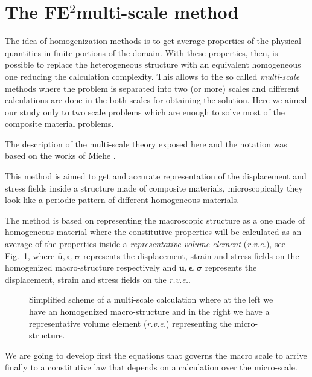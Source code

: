 \documentclass[preprint]{elsarticle}
\newcommand{\fe}{FE$^2$}
\begin{document}
\section{The \fe multi-scale method}

The idea of homogenization methods is to get average properties of the physical
quantities in finite portions of the domain. With these properties, then, is 
possible to replace the heterogeneous structure with an equivalent homogeneous
one reducing the calculation complexity. This allows to the so called
\emph{multi-scale} methods where the problem is separated into two (or more)
scales and different calculations are done in the both scales
for obtaining the solution. Here we aimed our study only to two scale problems
which are enough to solve most of the composite material problems.

The description of the multi-scale theory exposed here and the 
notation was based on the works of Miehe \cite{miehe2002}.

This method is aimed to get and accurate representation of the displacement 
and stress fields inside a structure made of composite materials, microscopically
they look like a periodic pattern of different homogeneous materials.

The method is based on representing the macroscopic structure as a one made of 
homogeneous material where the constitutive properties will be calculated as an 
average of the properties inside a \emph{representative volume element} (\emph{r.v.e.}),
see Fig.~\ref{fig:multi-scale}, where 
$\overline{\bm{u}}, \overline{\bm{\epsilon}}, \overline{\bm{\sigma}}$
represents the displacement, strain and stress fields on the homogenized
macro-structure respectively and
${\bm{u}}, {\bm{\epsilon}}, {\bm{\sigma}}$
represents the displacement, strain and stress fields on the \emph{r.v.e.}.

\begin{figure}[!ht]
\resizebox{8cm}{!}{}
\caption{\label{fig:multi-scale}Simplified scheme of a multi-scale calculation 
where at the left we have an homogenized macro-structure and 
in the right we have a representative volume element (\emph{r.v.e.}) 
representing the micro-structure.}
\end{figure}

We are going to develop first the equations that governs the macro scale
to arrive finally to a constitutive law that depends on a calculation over the
micro-scale.
\end{document}

